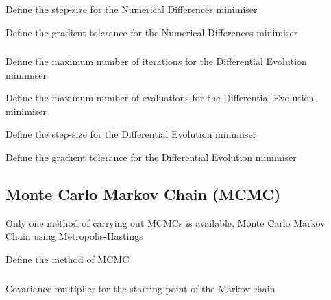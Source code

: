  {Define the step-size for the Numerical Differences minimiser}

 {Define the gradient tolerance for the Numerical Differences minimiser}

\subsubsection[Differential evolution minimiser]{} 

 {Define the maximum number of iterations for the Differential Evolution minimiser}

 {Define the maximum number of evaluations for the Differential Evolution minimiser}

 {Define the step-size for the Differential Evolution minimiser}

 {Define the gradient tolerance for the Differential Evolution minimiser}

\subsection{Monte Carlo Markov Chain (MCMC)}

Only one method of carrying out MCMCs is available, Monte Carlo Markov Chain using Metropolis-Hastings


 {Define the method of MCMC}

\subsubsection[Metropolis-Hastings]{} 

 {Covariance multiplier for the starting point of the Markov chain}

